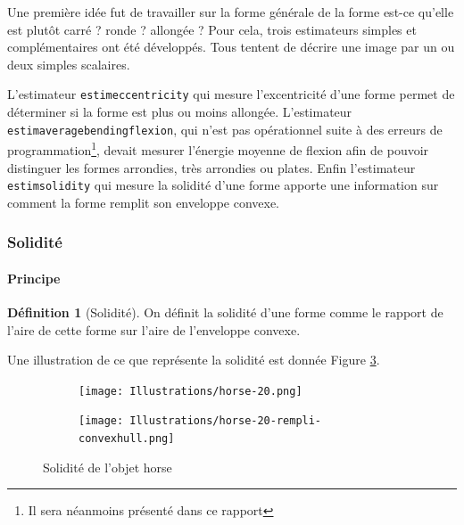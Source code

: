 \documentclass{article}
\theoremstyle{definition}
\newtheorem{definition}{Définition}
\begin{document}
      Une première idée fut de travailler sur la forme générale de la forme \textendash est-ce qu'elle est plutôt carré ? ronde ? allongée ? Pour cela, trois estimateurs simples et complémentaires ont été développés. Tous tentent de décrire une image par un ou deux simples scalaires.
      
      L'estimateur \texttt{estimeccentricity} qui mesure l'excentricité d'une forme permet de déterminer si la forme est plus ou moins allongée. L'estimateur \texttt{estimaveragebendingflexion}, qui n'est pas opérationnel suite à des erreurs de programmation\footnote{Il sera néanmoins présenté dans ce rapport}, devait mesurer l'énergie moyenne de flexion afin de pouvoir distinguer les formes arrondies, très arrondies ou plates. Enfin l'estimateur \texttt{estimsolidity} qui mesure la solidité d'une forme apporte une information sur comment la forme remplit son enveloppe convexe. %
    
      \subsubsection{Solidité}
      
	\paragraph{Principe}
	
	  \begin{definition}[Solidité]
	    On définit la solidité d'une forme comme le rapport de l'aire de cette forme sur l'aire de l'enveloppe convexe.
	  \end{definition}

	   Une illustration de ce que représente la solidité est donnée Figure \ref{solidité}.
	
	  \begin{figure}[!h]
	    \centering
	    \begin{subfigure}{.25\textwidth}
	      \centering
	      \texttt{[image: Illustrations/horse-20.png]}
	      \label{horse}
	    \end{subfigure}
	    \begin{subfigure}{.25\textwidth}
	      \centering
	      \texttt{[image: Illustrations/horse-20-rempli-convexhull.png]}
	    \label{horse-rempli-convexhull}
	    \end{subfigure}
	    \caption{Solidité de l'objet horse}
	    \label{solidité}
	  \end{figure}

	  
\end{document}

